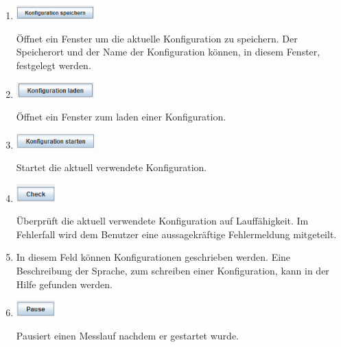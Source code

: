 \documentclass[parskip=full]{scrartcl}
\begin{document}
\begin{enumerate}
    \item
    \begin{flushleft}
        \includegraphics[width = 3cm]{Grafiken/4-Konfiguration_speichern.png}
    \end{flushleft}
    Öffnet ein Fenster um die aktuelle Konfiguration zu speichern. Der Speicherort und der Name der Konfiguration können, in diesem Fenster, festgelegt werden.
    
    \item
    \begin{flushleft}
        \includegraphics[width = 3cm]{Grafiken/5-Konfiguration_laden.png}
    \end{flushleft}
    Öffnet ein Fenster zum laden einer Konfiguration.
    
    \item
    \begin{flushleft}
        \includegraphics[width = 3cm]{Grafiken/6-Konfiguration_starten.png}
    \end{flushleft}
    Startet die aktuell verwendete Konfiguration.
    
    \item
    \begin{flushleft}
        \includegraphics[width = 1.5cm]{Grafiken/7-Check.png}
    \end{flushleft}
    Überprüft die aktuell verwendete Konfiguration auf Lauffähigkeit. Im Fehlerfall wird dem Benutzer eine aussagekräftige Fehlermeldung mitgeteilt.
    
    \item
    In diesem Feld können Konfigurationen geschrieben werden. Eine Beschreibung der Sprache, zum schreiben einer Konfiguration, kann in der Hilfe gefunden werden.
    
    \item
    \begin{flushleft}
        \includegraphics[width = 1.5cm]{Grafiken/9-Pause.png}
    \end{flushleft}
    Pausiert einen Messlauf nachdem er gestartet wurde.
    

\end{enumerate}
\end{document}
